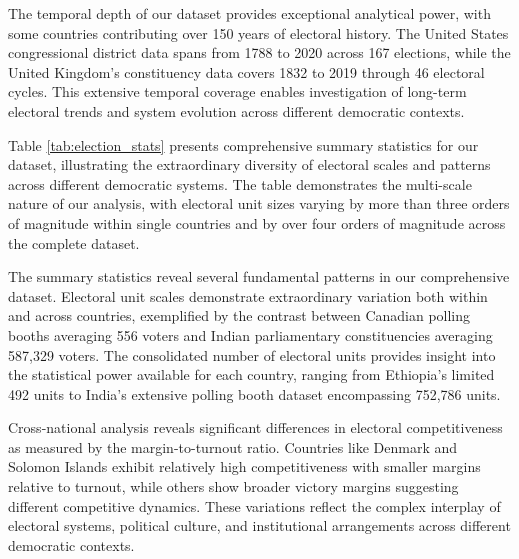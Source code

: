 The temporal depth of our dataset provides exceptional analytical power, with some countries contributing over 150 years of electoral history. The United States congressional district data spans from 1788 to 2020 across 167 elections, while the United Kingdom's constituency data covers 1832 to 2019 through 46 electoral cycles. This extensive temporal coverage enables investigation of long-term electoral trends and system evolution across different democratic contexts.

Table \ref{tab:election_stats} presents comprehensive summary statistics for our dataset, illustrating the extraordinary diversity of electoral scales and patterns across different democratic systems. The table demonstrates the multi-scale nature of our analysis, with electoral unit sizes varying by more than three orders of magnitude within single countries and by over four orders of magnitude across the complete dataset.

The summary statistics reveal several fundamental patterns in our comprehensive dataset. Electoral unit scales demonstrate extraordinary variation both within and across countries, exemplified by the contrast between Canadian polling booths averaging 556 voters and Indian parliamentary constituencies averaging 587,329 voters. The consolidated number of electoral units provides insight into the statistical power available for each country, ranging from Ethiopia's limited 492 units to India's extensive polling booth dataset encompassing 752,786 units.

Cross-national analysis reveals significant differences in electoral competitiveness as measured by the margin-to-turnout ratio. Countries like Denmark and Solomon Islands exhibit relatively high competitiveness with smaller margins relative to turnout, while others show broader victory margins suggesting different competitive dynamics. These variations reflect the complex interplay of electoral systems, political culture, and institutional arrangements across different democratic contexts.

